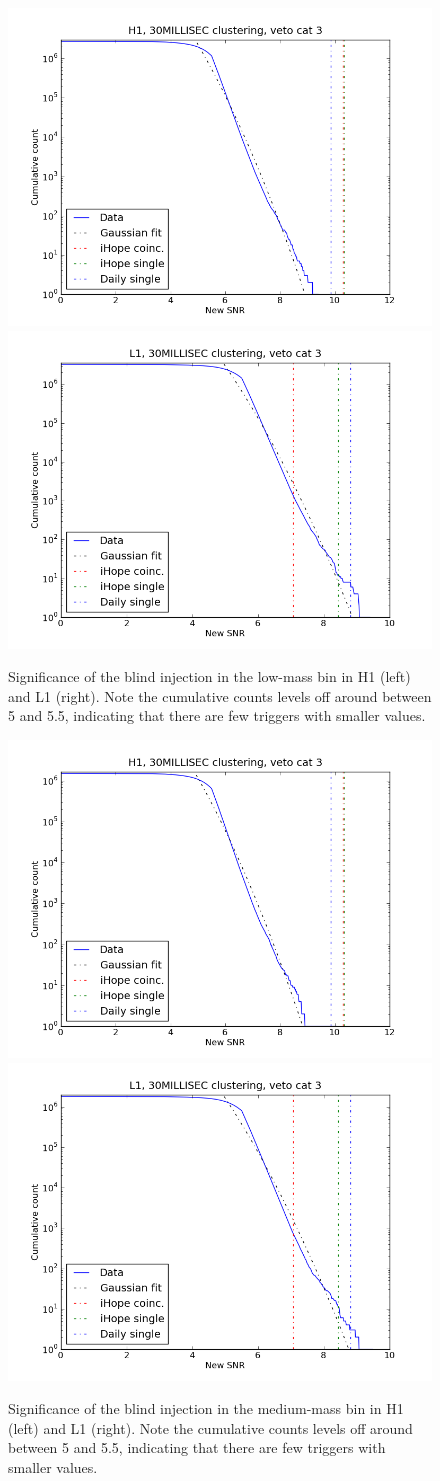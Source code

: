 \begin{figure}
  \includegraphics[width=0.5\linewidth]{figures/detchar/LM_H1_30MILLISEC_3_hist.png}
  \includegraphics[width=0.5\linewidth]{figures/detchar/LM_L1_30MILLISEC_3_hist.png}
  \caption[Significance of the injection in the low-mass bin]{
  \label{f:daily_histogram_low}
Significance of the blind injection in the low-mass bin in 
H1 (left) and L1 (right).  Note the cumulative counts levels off
around between 5 and 5.5, indicating that there are few triggers with
smaller values.}
\end{figure}%



\begin{figure}
  \includegraphics[width=0.5\linewidth]{figures/detchar/MM_H1_30MILLISEC_3_hist.png}
  \includegraphics[width=0.5\linewidth]{figures/detchar/MM_L1_30MILLISEC_3_hist.png}
  \caption[Significance of the injection in the medium-mass bin]{
  \label{f:daily_histogram_medium}
Significance of the blind injection in the medium-mass bin in 
H1 (left) and L1 (right).  Note the cumulative counts levels off
around between 5 and 5.5, indicating that there are few triggers with
smaller values.}
\end{figure}%


